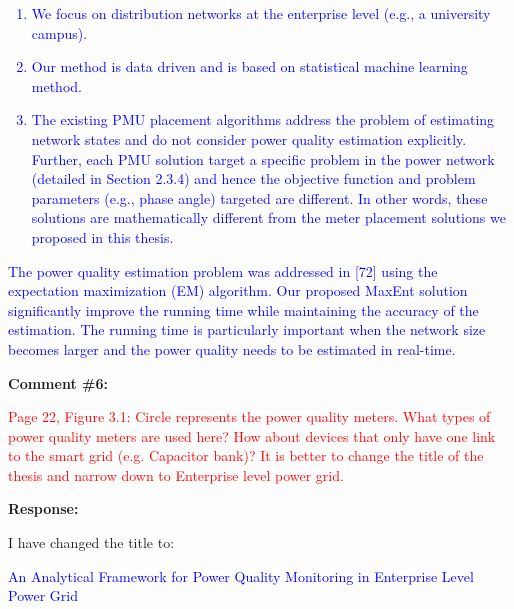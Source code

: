 \documentclass[journal]{IEEEtran}
\begin{document}
\vspace{-1em}
\begin{adjustwidth}{3.5em}{0pt}
\noindent\textcolor{blue}{
\begin{enumerate}
\item We focus on distribution networks at the enterprise level (e.g., a university
campus).
\item Our method is data driven and is based on statistical machine learning method.
\item The existing PMU placement algorithms address the problem of estimating network states and do not consider power quality estimation explicitly. Further, each PMU solution target a specific problem in the power network (detailed in Section 2.3.4) and hence the objective function and problem parameters (e.g., phase angle) targeted are different. In other words, these solutions are mathematically different from the meter placement solutions we proposed in this thesis.
\end{enumerate}
}
\end{adjustwidth}

\begin{adjustwidth}{2.5em}{0pt}
\noindent\textcolor{blue}{The power quality estimation problem was addressed in [72] using the expectation maximization (EM) algorithm. Our proposed MaxEnt solution significantly improve the running time while maintaining the accuracy of the estimation. The running time is particularly important when the network size becomes larger and the power quality needs to be estimated in real-time.}
\end{adjustwidth}



\vspace{30pt}
\textbf{Comment \#6:}
\begin{adjustwidth}{2.5em}{0pt}
\singlespacing \vspace{-10pt}
\textcolor{red}{Page 22, Figure 3.1: Circle represents the power quality meters. What types of power quality meters are used here? How about devices that only have one link to the smart grid (e.g. Capacitor bank)? It is better to change the title of the thesis and narrow down to Enterprise level power grid.}
\end{adjustwidth}

\vspace{5pt}
\textbf{Response:}
\begin{adjustwidth}{2.5em}{0pt}
I have changed the title to:

\vspace{5pt}
\noindent\textcolor{blue}{An Analytical Framework for Power Quality Monitoring in Enterprise Level Power Grid}
\end{adjustwidth}
\end{document}
